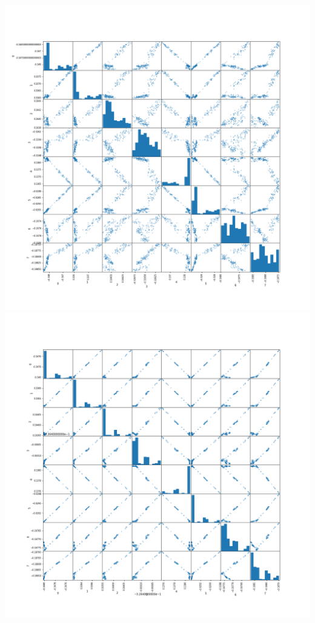 \documentclass{article}
\begin{document}
\begin{center}
\includegraphics[width=\linewidth]{200_10_0_8_15.png}
\includegraphics[width=\linewidth]{200_10_0_8_20.png}

\end{center}
\end{document}
